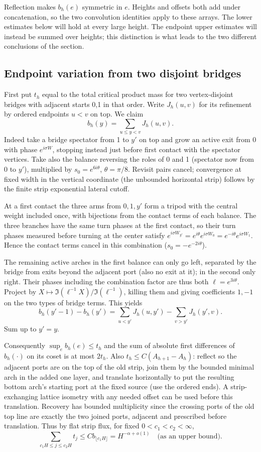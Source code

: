 \documentclass[11pt]{article}
\numberwithin{equation}{section}
\theoremstyle{definition}\newtheorem{definition}[theorem]{Definition}
\theoremstyle{remark}\newtheorem{remark}[theorem]{Remark}
\begin{document}
Reflection makes $b_h(e)$ symmetric in $e$. Heights and offsets both add under concatenation, so the two convolution identities apply to these arrays.
The lower estimates below will hold at every large height. The endpoint
upper estimates will instead be summed over heights; this distinction is
what leads to the two different conclusions of the section.

\subsection{Endpoint variation from two disjoint bridges}
First put \(t_h\) equal to the total critical product mass for two vertex-disjoint bridges with adjacent starts 0,1 in that order. Write \(J_h(u,v)\) for its refinement by ordered endpoints \(u<v\) on top. We claim
\[
 b_h(y)=\sum_{u\le y<v}J_h(u,v).
\]
Indeed take a bridge spectator from 1 to \(y'\) on top and grow an active exit from 0 with phase \(e^{i\sigma W}\), stopping instead just before first contact with the spectator vertices. Take also the balance reversing the roles of 0 and 1 (spectator now from 0 to \(y'\)), multiplied by \(s_0=e^{6i\theta}\), \(\theta=\pi/8\). Revisit pairs cancel; convergence at fixed width in the vertical coordinate (the unbounded horizontal strip) follows by the finite strip exponential lateral cutoff.

At a first contact the three arms from \(0,1,y'\) form a tripod with the central weight included once, with bijections from the contact terms of each balance. The three branches have the same turn phases at the first contact, so their turn phases measured before turning at the center satisfy
\(e^{i\sigma W_{y'}}=e^{i\theta}e^{i\sigma W_0}=e^{-i\theta}e^{i\sigma W_1}\).
Hence the contact terms cancel in this combination (\(s_0=-e^{-2i\theta}\)).

The remaining active arches in the first balance can only go left, separated by the bridge from exits beyond the adjacent port (also no exit at it); in the second only right. Their phases including the combination factor are thus both \(\ell=e^{3i\theta}\). Project by \(X\mapsto \Im(\ell^{-1}X)/\Im(\ell^{-1})\), killing them and giving coefficients \(1,-1\) on the two types of bridge terms. This yields
\[
 b_h(y'-1)-b_h(y')=\sum_{u<y'}J_h(u,y')-\sum_{v>y'}J_h(y',v).
\]
Sum up to \(y'=y\).

Consequently \(\sup_e b_h(e)\le t_h\) and the sum of absolute first differences of \(b_h(\cdot)\) on its coset is at most \(2t_h\). Also
\(t_h\le C(A_{h+1}-A_h)\): reflect so the adjacent ports are on the top of the old strip, join them by the bounded minimal arch in the added one layer, and translate horizontally to put the resulting bottom arch's starting port at the fixed source (use the ordered ends). A strip-exchanging lattice isometry with any needed offset can be used before this translation. Recovery has bounded multiplicity since the crossing ports of the old top line are exactly the two joined ports, adjacent and prescribed before translation. Thus by flat strip flux, for fixed \(0<c_1<c_2<\infty\),
\[
 \sum_{c_1 H\le j\le c_2 H} t_j \le C b_{\lfloor c_1H\rfloor}=H^{-\alpha+o(1)}\quad\text{(as an upper bound)} .
\]
\end{document}
